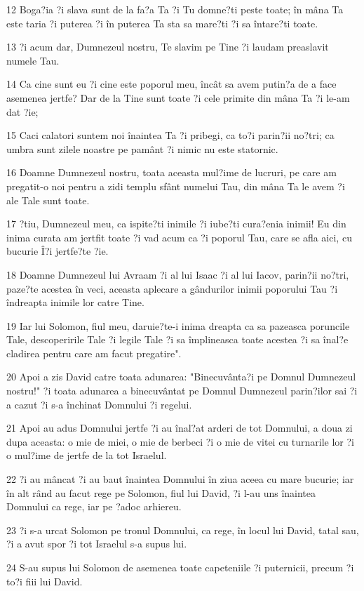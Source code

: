 \par 12 Boga?ia ?i slava sunt de la fa?a Ta ?i Tu domne?ti peste toate; în mâna Ta este taria ?i puterea ?i în puterea Ta sta sa mare?ti ?i sa întare?ti toate.
\par 13 ?i acum dar, Dumnezeul nostru, Te slavim pe Tine ?i laudam preaslavit numele Tau.
\par 14 Ca cine sunt eu ?i cine este poporul meu, încât sa avem putin?a de a face asemenea jertfe? Dar de la Tine sunt toate ?i cele primite din mâna Ta ?i le-am dat ?ie;
\par 15 Caci calatori suntem noi înaintea Ta ?i pribegi, ca to?i parin?ii no?tri; ca umbra sunt zilele noastre pe pamânt ?i nimic nu este statornic.
\par 16 Doamne Dumnezeul nostru, toata aceasta mul?ime de lucruri, pe care am pregatit-o noi pentru a zidi templu sfânt numelui Tau, din mâna Ta le avem ?i ale Tale sunt toate.
\par 17 ?tiu, Dumnezeul meu, ca ispite?ti inimile ?i iube?ti cura?enia inimii! Eu din inima curata am jertfit toate ?i vad acum ca ?i poporul Tau, care se afla aici, cu bucurie Î?i jertfe?te ?ie.
\par 18 Doamne Dumnezeul lui Avraam ?i al lui Isaac ?i al lui Iacov, parin?ii no?tri, paze?te acestea în veci, aceasta aplecare a gândurilor inimii poporului Tau ?i îndreapta inimile lor catre Tine.
\par 19 Iar lui Solomon, fiul meu, daruie?te-i inima dreapta ca sa pazeasca poruncile Tale, descoperirile Tale ?i legile Tale ?i sa împlineasca toate acestea ?i sa înal?e cladirea pentru care am facut pregatire".
\par 20 Apoi a zis David catre toata adunarea: "Binecuvânta?i pe Domnul Dumnezeul nostru!" ?i toata adunarea a binecuvântat pe Domnul Dumnezeul parin?ilor sai ?i a cazut ?i s-a închinat Domnului ?i regelui.
\par 21 Apoi au adus Domnului jertfe ?i au înal?at arderi de tot Domnului, a doua zi dupa aceasta: o mie de miei, o mie de berbeci ?i o mie de vitei cu turnarile lor ?i o mul?ime de jertfe de la tot Israelul.
\par 22 ?i au mâncat ?i au baut înaintea Domnului în ziua aceea cu mare bucurie; iar în alt rând au facut rege pe Solomon, fiul lui David, ?i l-au uns înaintea Domnului ca rege, iar pe ?adoc arhiereu.
\par 23 ?i s-a urcat Solomon pe tronul Domnului, ca rege, în locul lui David, tatal sau, ?i a avut spor ?i tot Israelul s-a supus lui.
\par 24 S-au supus lui Solomon de asemenea toate capeteniile ?i puternicii, precum ?i to?i fiii lui David.
